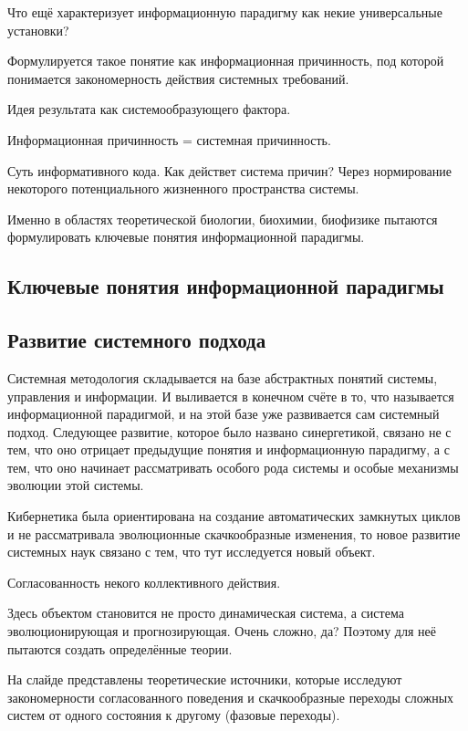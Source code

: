 \documentclass[main.tex]{subfiles}
\begin{document}
Что ещё характеризует информационную парадигму как некие универсальные установки?

Формулируется такое понятие как информационная причинность, под которой понимается закономерность действия системных требований.

Идея результата как системообразующего фактора.

Информационная причинность = системная причинность.

Суть информативного кода.
Как действет система причин?
Через нормирование некоторого потенциального жизненного пространства системы.

Именно в областях теоретической биологии, биохимии, биофизике пытаются формулировать ключевые понятия информационной парадигмы.

\subsection{Ключевые понятия информационной парадигмы}


\subsection{Развитие системного подхода}


Системная методология складывается на базе абстрактных понятий системы, управления и информации.
И выливается в конечном счёте в то, что называется информационной парадигмой, и на этой базе уже развивается сам системный подход.
Следующее развитие, которое было названо синергетикой, связано не с тем, что оно отрицает предыдущие понятия и информационную парадигму, а с тем, что оно начинает рассматривать особого рода системы и особые механизмы эволюции этой системы.

Кибернетика была ориентирована на создание автоматических замкнутых циклов и не рассматривала эволюционные скачкообразные изменения, то новое развитие системных наук связано с тем, что тут исследуется новый объект.

Согласованность некого коллективного действия.

Здесь объектом становится не просто динамическая система, а система эволюционирующая и прогнозирующая.
Очень сложно, да?
Поэтому для неё пытаются создать определённые теории.

На слайде представлены теоретические источники, которые исследуют закономерности согласованного поведения и скачкообразные переходы сложных систем от одного состояния к другому (фазовые переходы).
\end{document}
